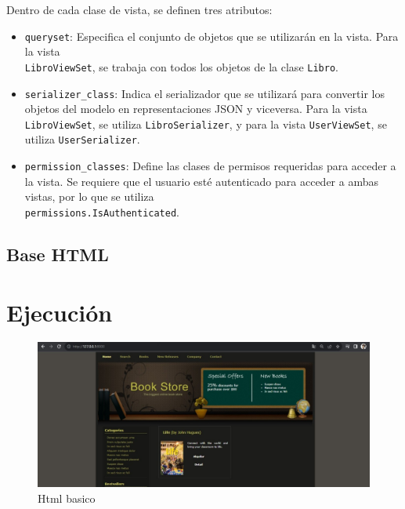 \documentclass{article}
\begin{document}
	Dentro de cada clase de vista, se definen tres atributos:
	\begin{itemize}
		\item \texttt{queryset}: Especifica el conjunto de objetos que se utilizarán en la vista. Para la vista\\ \texttt{LibroViewSet}, se trabaja con todos los objetos de la clase \texttt{Libro}.
		\item \texttt{serializer\_class}: Indica el serializador que se utilizará para convertir los objetos del modelo en representaciones JSON y viceversa. Para la vista \texttt{LibroViewSet}, se utiliza \texttt{LibroSerializer}, y para la vista \texttt{UserViewSet}, se utiliza \texttt{UserSerializer}.
		\item \texttt{permission\_classes}: Define las clases de permisos requeridas para acceder a la vista. Se requiere que el usuario esté autenticado para acceder a ambas vistas, por lo que se utiliza\\ \texttt{permissions.IsAuthenticated}.
	\end{itemize}
	
	
	
	
	\subsection{Base HTML}
	
	
	
	
	\section{Ejecución}
	
	\begin{figure}[h]
		\centering
		\includegraphics[width=\textwidth]{img/htmlbase.jpeg}
		\caption{Html basico}
	\end{figure}
	
\end{document}

